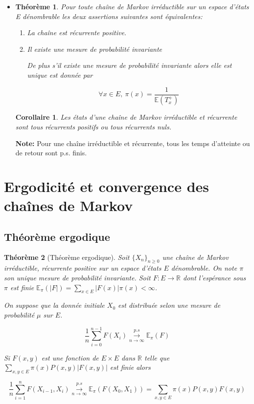 \documentclass[10pt,a4paper,oneside]{article}
\newtheorem{theoreme}{Théorème}
\newtheorem{corollaire}{Corollaire}
\begin{document}
\begin{itemize}
\item
\begin{theoreme}
Pour toute chaîne de Markov irréductible sur un espace d'états E dénombrable les deux assertions suivantes sont équivalentes:

\begin{enumerate}
\item
La chaîne est récurrente positive.
\item
Il existe une mesure de probabilité invariante

De plus s'il existe une mesure de probabilité invariante alors elle est unique est donnée par

\[ \forall x \in E,\ \pi(x) = \frac{1}{\mathbb{E}(T_x^+)} \]
\end{enumerate}
\end{theoreme}

\begin{corollaire}
Les états d'une chaîne de Markov irréductible et récurrente sont tous récurrents positifs ou tous récurrents nuls.
\end{corollaire}

\textbf{Note:} Pour une chaîne irréductible et récurrente, tous les temps d'atteinte ou de retour sont p.s. finis.

\end{itemize}

\section{Ergodicité et convergence des chaînes de Markov}

\subsection{Théorème ergodique}

\begin{theoreme}[Théorème ergodique]
Soit $\{ X_n \}_{n \geq 0}$ une chaîne de Markov irréductible, récurrente positive sur un espace d'états $E$ dénombrable. On note $\pi$ son unique mesure de probabilité invariante. Soit $F:E \to \mathbb{R}$ dont l'espérance sous $\pi$ est finie $\mathbb{E}_\pi(|F|) = \sum_{x \in E} |F(x)| \pi(x) < \infty$.

On suppose que la donnée initiale $X_0$ est distribuée selon une mesure de probabilité $\mu$ sur $E$.

\[ \frac{1}{n} \sum_{i = 0}^{n - 1} F(X_i) \overset{p.s}{ \underset{n \to \infty}{\rightarrow} } \mathbb{E}_\pi(F) \]

Si $F(x,y)$ est une fonction de $E \times E$ dans $\mathbb{R}$ telle que $\sum_{x,y \in E} \pi(x) P(x,y) |F(x,y)|$ est finie alors

\[ \frac{1}{n} \sum_{i = 1}^n F(X_{i - 1},X_i) \overset{p.s}{ \underset{n \to \infty}{\rightarrow} } \mathbb{E}_\pi(F(X_0,X_1)) = \sum_{x,y \in E} \pi(x) P(x,y) F(x,y) \]
\end{theoreme}
\end{document}

